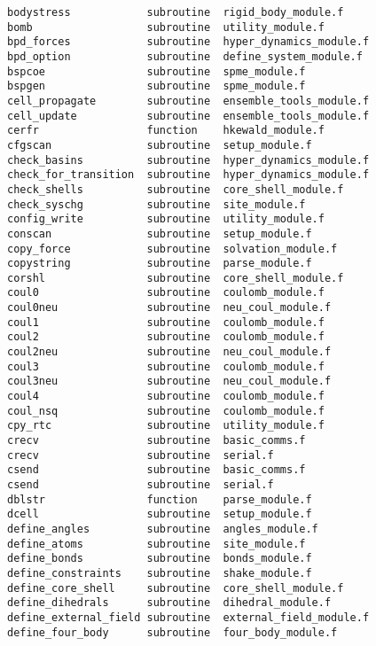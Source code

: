 \begin{verbatim}
bodystress            subroutine  rigid_body_module.f       
bomb                  subroutine  utility_module.f          
bpd_forces            subroutine  hyper_dynamics_module.f   
bpd_option            subroutine  define_system_module.f    
bspcoe                subroutine  spme_module.f             
bspgen                subroutine  spme_module.f             
cell_propagate        subroutine  ensemble_tools_module.f   
cell_update           subroutine  ensemble_tools_module.f   
cerfr                 function    hkewald_module.f          
cfgscan               subroutine  setup_module.f            
check_basins          subroutine  hyper_dynamics_module.f   
check_for_transition  subroutine  hyper_dynamics_module.f   
check_shells          subroutine  core_shell_module.f       
check_syschg          subroutine  site_module.f             
config_write          subroutine  utility_module.f          
conscan               subroutine  setup_module.f            
copy_force            subroutine  solvation_module.f        
copystring            subroutine  parse_module.f            
corshl                subroutine  core_shell_module.f       
coul0                 subroutine  coulomb_module.f          
coul0neu              subroutine  neu_coul_module.f         
coul1                 subroutine  coulomb_module.f          
coul2                 subroutine  coulomb_module.f          
coul2neu              subroutine  neu_coul_module.f         
coul3                 subroutine  coulomb_module.f          
coul3neu              subroutine  neu_coul_module.f         
coul4                 subroutine  coulomb_module.f          
coul_nsq              subroutine  coulomb_module.f          
cpy_rtc               subroutine  utility_module.f          
crecv                 subroutine  basic_comms.f             
crecv                 subroutine  serial.f                  
csend                 subroutine  basic_comms.f             
csend                 subroutine  serial.f                  
dblstr                function    parse_module.f            
dcell                 subroutine  setup_module.f            
define_angles         subroutine  angles_module.f           
define_atoms          subroutine  site_module.f             
define_bonds          subroutine  bonds_module.f            
define_constraints    subroutine  shake_module.f            
define_core_shell     subroutine  core_shell_module.f       
define_dihedrals      subroutine  dihedral_module.f         
define_external_field subroutine  external_field_module.f   
define_four_body      subroutine  four_body_module.f        

\end{verbatim}
